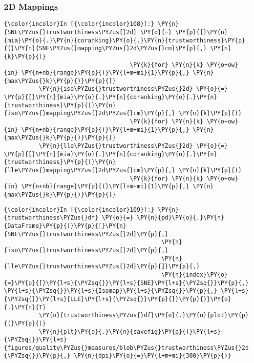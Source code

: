     \subsubsection{2D Mappings}\label{d-mappings}

    \begin{Verbatim}[commandchars=\\\{\}]
{\color{incolor}In [{\color{incolor}108}]:} \PY{n}{SNE\PYZus{}trustworthiness\PYZus{}2d} \PY{o}{=} \PY{p}{[}\PY{n}{mia}\PY{o}{.}\PY{n}{coranking}\PY{o}{.}\PY{n}{trustworthiness}\PY{p}{(}\PY{n}{SNE\PYZus{}mapping\PYZus{}2d\PYZus{}cm}\PY{p}{,} \PY{n}{k}\PY{p}{)}
                                    \PY{k}{for} \PY{n}{k} \PY{o+ow}{in} \PY{n+nb}{range}\PY{p}{(}\PY{l+m+mi}{1}\PY{p}{,} \PY{n}{max\PYZus{}k}\PY{p}{)}\PY{p}{]}
          \PY{n}{iso\PYZus{}trustworthiness\PYZus{}2d} \PY{o}{=} \PY{p}{[}\PY{n}{mia}\PY{o}{.}\PY{n}{coranking}\PY{o}{.}\PY{n}{trustworthiness}\PY{p}{(}\PY{n}{iso\PYZus{}mapping\PYZus{}2d\PYZus{}cm}\PY{p}{,} \PY{n}{k}\PY{p}{)}
                                    \PY{k}{for} \PY{n}{k} \PY{o+ow}{in} \PY{n+nb}{range}\PY{p}{(}\PY{l+m+mi}{1}\PY{p}{,} \PY{n}{max\PYZus{}k}\PY{p}{)}\PY{p}{]}
          \PY{n}{lle\PYZus{}trustworthiness\PYZus{}2d} \PY{o}{=} \PY{p}{[}\PY{n}{mia}\PY{o}{.}\PY{n}{coranking}\PY{o}{.}\PY{n}{trustworthiness}\PY{p}{(}\PY{n}{lle\PYZus{}mapping\PYZus{}2d\PYZus{}cm}\PY{p}{,} \PY{n}{k}\PY{p}{)}
                                    \PY{k}{for} \PY{n}{k} \PY{o+ow}{in} \PY{n+nb}{range}\PY{p}{(}\PY{l+m+mi}{1}\PY{p}{,} \PY{n}{max\PYZus{}k}\PY{p}{)}\PY{p}{]}
\end{Verbatim}

    \begin{Verbatim}[commandchars=\\\{\}]
{\color{incolor}In [{\color{incolor}109}]:} \PY{n}{trustworthiness\PYZus{}df} \PY{o}{=} \PY{n}{pd}\PY{o}{.}\PY{n}{DataFrame}\PY{p}{(}\PY{p}{[}\PY{n}{SNE\PYZus{}trustworthiness\PYZus{}2d}\PY{p}{,}
                                             \PY{n}{iso\PYZus{}trustworthiness\PYZus{}2d}\PY{p}{,}
                                             \PY{n}{lle\PYZus{}trustworthiness\PYZus{}2d}\PY{p}{]}\PY{p}{,}
                                             \PY{n}{index}\PY{o}{=}\PY{p}{[}\PY{l+s}{\PYZsq{}}\PY{l+s}{SNE}\PY{l+s}{\PYZsq{}}\PY{p}{,} \PY{l+s}{\PYZsq{}}\PY{l+s}{Isomap}\PY{l+s}{\PYZsq{}}\PY{p}{,} \PY{l+s}{\PYZsq{}}\PY{l+s}{LLE}\PY{l+s}{\PYZsq{}}\PY{p}{]}\PY{p}{)}\PY{o}{.}\PY{n}{T}
          \PY{n}{trustworthiness\PYZus{}df}\PY{o}{.}\PY{n}{plot}\PY{p}{(}\PY{p}{)}
          \PY{n}{plt}\PY{o}{.}\PY{n}{savefig}\PY{p}{(}\PY{l+s}{\PYZsq{}}\PY{l+s}{figures/quality\PYZus{}measures/blob\PYZus{}trustworthiness\PYZus{}2d.png}\PY{l+s}{\PYZsq{}}\PY{p}{,} \PY{n}{dpi}\PY{o}{=}\PY{l+m+mi}{300}\PY{p}{)}
\end{Verbatim}

